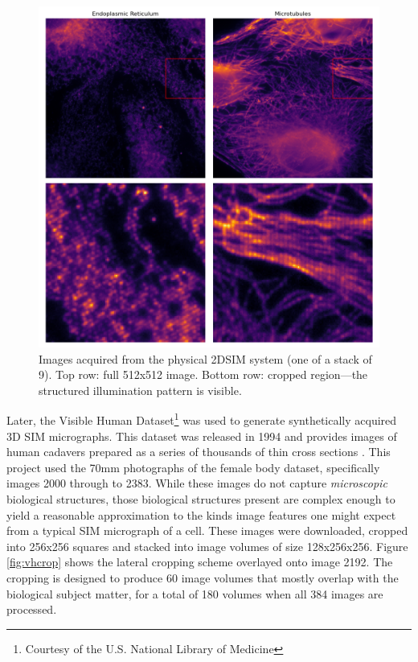 \documentclass[12pt]{article}
\begin{document}
\begin{figure}[hbtp]
    \includegraphics[scale=0.53, center]{figures/2DSIM.png}
    \caption{Images acquired from the physical 2DSIM system (one of a stack of 9).
    Top row: full 512x512 image. Bottom row: cropped region---the structured illumination pattern is visible.}
    \label{fig:2DSIM}
\end{figure}

Later, the Visible Human Dataset\footnote{Courtesy of the U.S. National Library of Medicine} was used to generate synthetically acquired 3D SIM micrographs.
This dataset was released in 1994 and provides images of human cadavers prepared as a series of thousands of thin cross sections \cite{vhdata}.
This project used the 70mm photographs of the female body dataset, specifically images 2000 through to 2383.
While these images do not capture \textit{microscopic} biological structures,
those biological structures present are complex enough to yield a reasonable approximation to the kinds image features one might expect from a typical SIM micrograph of a cell.
These images were downloaded, cropped into 256x256 squares and stacked into image volumes of size 128x256x256.
Figure \ref{fig:vhcrop} shows the lateral cropping scheme overlayed onto image 2192.
The cropping is designed to produce 60 image volumes that mostly overlap with the biological subject matter,
for a total of 180 volumes when all 384 images are processed.
\end{document}
